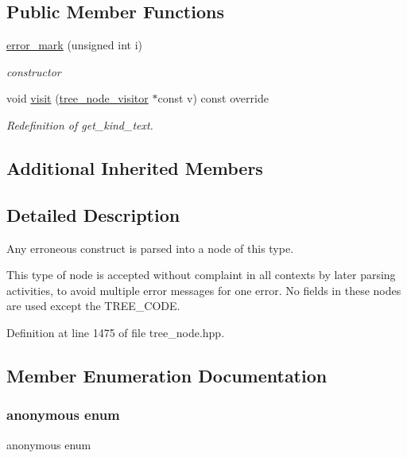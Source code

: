 \subsection*{Public Member Functions}
\begin{DoxyCompactItemize}
\item 
\hyperlink{structerror__mark_a9cdcb3763ecb8e7a25f3548187a0347a}{error\+\_\+mark} (unsigned int i)
\begin{DoxyCompactList}\small\item\em constructor \end{DoxyCompactList}\item 
void \hyperlink{structerror__mark_a13abf9f9413d995a63882a657049d7c5}{visit} (\hyperlink{classtree__node__visitor}{tree\+\_\+node\+\_\+visitor} $\ast$const v) const override
\begin{DoxyCompactList}\small\item\em Redefinition of get\+\_\+kind\+\_\+text. \end{DoxyCompactList}\end{DoxyCompactItemize}
\subsection*{Additional Inherited Members}


\subsection{Detailed Description}
Any erroneous construct is parsed into a node of this type. 

This type of node is accepted without complaint in all contexts by later parsing activities, to avoid multiple error messages for one error. No fields in these nodes are used except the T\+R\+E\+E\+\_\+\+C\+O\+DE. 

Definition at line 1475 of file tree\+\_\+node.\+hpp.



\subsection{Member Enumeration Documentation}
\mbox{\label{structerror__mark_a87b50c3f099b89b0f7ae1b9db42b7bc0}} 
\subsubsection{\texorpdfstring{anonymous enum}{anonymous enum}}
{\footnotesize\ttfamily anonymous enum}




